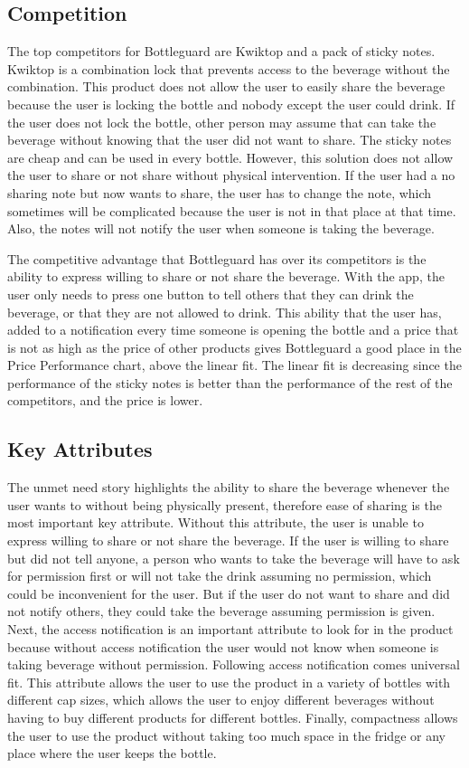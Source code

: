 \documentclass[12pt]{article}
\begin{document}
	\subsection*{Competition}
	The top competitors for Bottleguard are Kwiktop and a pack of sticky notes. Kwiktop is a combination lock that prevents access to the beverage without the combination. This product does not allow the user to easily share the beverage because the user is locking the bottle and nobody except the user could drink. If the user does not lock the bottle, other person may assume that can take the beverage without knowing that the user did not want to share. The sticky notes are cheap and can be used in every bottle. However, this solution does not allow the user to share or not share without physical intervention. If the user had a no sharing note but now wants to share, the user has to change the note, which sometimes will be complicated because the user is not in that place at that time. Also, the notes will not notify the user when someone is taking the beverage.
	
	The competitive advantage that Bottleguard has over its competitors is the ability to express willing to share or not share the beverage. With the app, the user only needs to press one button to tell others that they can drink the beverage, or that they are not allowed to drink. This ability that the user has, added to a notification every time someone is opening the bottle and a price that is not as high as the price of other products gives Bottleguard a good place in the Price Performance chart, above the linear fit. The linear fit is decreasing since the performance of the sticky notes is better than the performance of the rest of the competitors, and the price is lower. 
	
	\subsection*{Key Attributes}
	The unmet need story highlights the ability to share the beverage whenever the user wants to without being physically present, therefore ease of sharing is the most important key attribute. Without this attribute, the user is unable to express willing to share or not share the beverage. If the user is willing to share but did not tell anyone, a person who wants to take the beverage will have to ask for permission first or will not take the drink assuming no permission, which could be inconvenient for the user. But if the user do not want to share and did not notify others, they could take the beverage assuming permission is given. Next, the access notification is an important attribute to look for in the product because without access notification the user would not know when someone is taking beverage without permission. Following access notification comes universal fit. This attribute allows the user to use the product in a variety of bottles with different cap sizes, which allows the user to enjoy different beverages without having to buy different products for different bottles. Finally, compactness allows the user to use the product without taking too much space in the fridge or any place where the user keeps the bottle.
	
\end{document}
